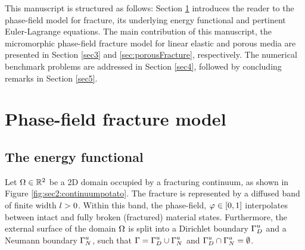 \documentclass[11pt]{article}
\begin{document}
This manuscript is structured as follows: Section \ref{sec2} introduces the reader to the phase-field model for fracture, its underlying energy functional and pertinent Euler-Lagrange equations. The main contribution of this manuscript, the micromorphic phase-field fracture model for linear elastic and porous media are presented in Section \ref{sec3} and \ref{sec:porousFracture}, respectively. The numerical benchmark problems are addressed in Section \ref{sec4}, followed by concluding remarks in Section \ref{sec5}.

\section{Phase-field fracture model}\label{sec2}

\subsection{The energy functional}\label{sec2:energyFunc}

Let $\hbox{$\Omega$} \in \mathbb{R}^2$ be a 2D domain occupied by a fracturing continuum, as shown in Figure \ref{fig:sec2:continuumpotato}. The fracture is represented by a diffused band of finite width $\hbox{$l$}>0$. Within this band, the phase-field, $\hbox{$\varphi$} \in [0,1]$ interpolates between intact and fully broken (fractured) material states. Furthermore, the external surface of the domain $\hbox{$\Omega$}$ is split into a Dirichlet boundary $\hbox{$\hbox{$\Gamma$}_{D}^{\scriptsize{u}}$}$ and a Neumann boundary $\hbox{$\hbox{$\Gamma$}_{N}^{\scriptsize{u}}$}$, such that $\hbox{$\Gamma$} = \hbox{$\hbox{$\Gamma$}_{D}^{\scriptsize{u}}$} \cup \hbox{$\hbox{$\Gamma$}_{N}^{\scriptsize{u}}$}$ and $\hbox{$\hbox{$\Gamma$}_{D}^{\scriptsize{u}}$} \cap \hbox{$\hbox{$\Gamma$}_{N}^{\scriptsize{u}}$} = \emptyset$.
\end{document}
